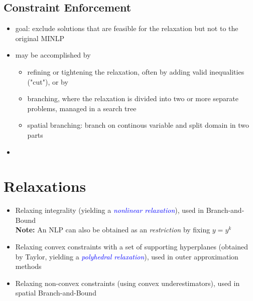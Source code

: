 \documentclass{article}
\begin{document}
\subsection{Constraint Enforcement}
\begin{itemize}
\item goal: exclude solutions that are feasible for the relaxation but not to the original MINLP
\item may be accomplished by 
\begin{itemize}
\item refining or tightening the relaxation, often by adding valid inequalities ("cut"), or by 
\item branching, where the relaxation is divided into two or more separate problems, managed in a search tree
\item spatial branching: branch on continous variable and split domain in two parts
\end{itemize}
\item 
\end{itemize} 
 
\section{Relaxations}
\begin{itemize}
\item Relaxing integrality (yielding a \textcolor{blue}{\textit{nonlinear relaxation}}), used in Branch-and-Bound\\
\textbf{Note:} An NLP can also be obtained as an \textit{restriction} by fixing $y=y^k$

\item Relaxing convex constraints with a set of supporting hyperplanes (obtained by Taylor, yielding a \textcolor{blue}{\textit{polyhedral relaxation}}), used in outer approximation methods
\item Relaxing non-convex constraints (using convex underestimators), used in spatial Branch-and-Bound
\end{itemize}
\end{document}
